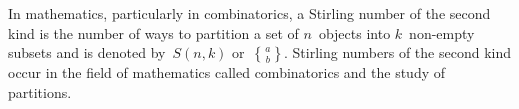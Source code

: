 \documentclass{article}
\DeclareRobustCommand{\stirling}{\genfrac\{\}{0pt}{}}
\begin{document}
In mathematics, particularly in combinatorics, a Stirling number of the second kind 
is the number of ways to partition a set of $n$~objects into $k$~non-empty subsets and 
is denoted by~$S(n,k)$ or~$\stirling{a}{b}$. Stirling numbers of the second kind occur 
in the field of mathematics called combinatorics and the study of partitions.
\end{document}
